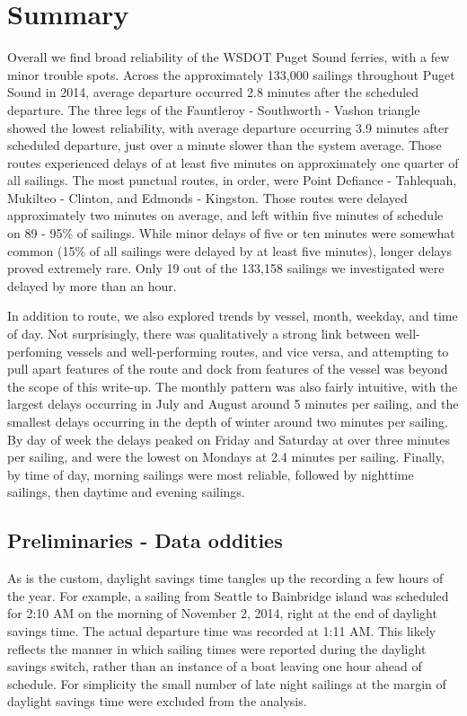 \documentclass[11pt, letterpaper]{article}
\begin{document}
\section*{Summary}

Overall we find broad reliability of the WSDOT Puget Sound ferries, with a few minor trouble spots. Across the approximately 133,000 sailings throughout Puget Sound in 2014, average departure occurred 2.8 minutes after the scheduled departure. The three legs of the Fauntleroy - Southworth - Vashon triangle showed the lowest reliability, with average departure occurring 3.9 minutes after scheduled departure, just over a minute slower than the system average. Those routes experienced delays of at least five minutes on approximately one quarter of all sailings. The most punctual routes, in order, were Point Defiance - Tahlequah, Mukilteo - Clinton, and Edmonds - Kingston. Those routes were delayed approximately two minutes on average, and left within five minutes of schedule on 89 - 95\% of sailings. While minor delays of five or ten minutes were somewhat common (15\% of all sailings were delayed by at least five minutes), longer delays proved extremely rare. Only 19 out of the 133,158 sailings we investigated were delayed by more than an hour.

In addition to route, we also explored trends by vessel, month, weekday, and time of day. Not surprisingly, there was qualitatively a strong link between well-perfoming vessels and well-performing routes, and vice versa, and attempting to pull apart features of the route and dock from features of the vessel was beyond the scope of this write-up. The monthly pattern was also fairly intuitive, with the largest delays occurring in July and August around 5 minutes per sailing, and the smallest delays occurring in the depth of winter around two minutes per sailing. By day of week the delays peaked on Friday and Saturday at over three minutes per sailing, and were the lowest on Mondays at 2.4 minutes per sailing. Finally, by time of day, morning sailings were most reliable, followed by nighttime sailings, then daytime and evening sailings.

\subsection*{Preliminaries - Data oddities}

As is the custom, daylight savings time tangles up the recording a few hours of the year. For example, a sailing from Seattle to Bainbridge island was scheduled for 2:10 AM on the morning of November 2, 2014, right at the end of daylight savings time. The actual departure time was recorded at 1:11 AM. This likely reflects the manner in which sailing times were reported during the daylight savings switch, rather than an instance of a boat leaving one hour ahead of schedule. For simplicity the small number of late night sailings at the margin of daylight savings time were excluded from the analysis.
\end{document}

